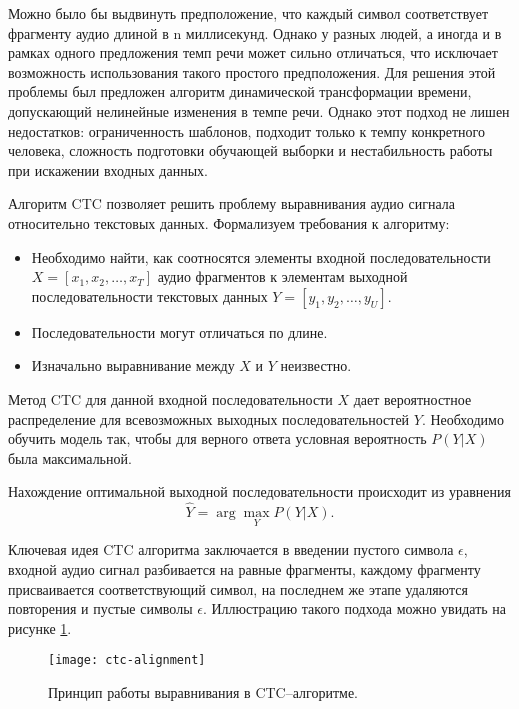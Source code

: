 Можно было бы выдвинуть предположение, что каждый символ соответствует фрагменту аудио длиной в n миллисекунд. Однако у разных людей, а иногда и в рамках одного предложения темп речи может сильно отличаться, что исключает возможность использования такого простого предположения. Для решения этой проблемы был предложен алгоритм динамической трансформации времени\cite{berndt1994using}, допускающий нелинейные изменения в темпе речи. Однако этот подход не лишен недостатков: ограниченность шаблонов, подходит только к темпу конкретного человека, сложность подготовки обучающей выборки и нестабильность работы при искажении входных данных.

Алгоритм CTC позволяет решить проблему выравнивания аудио сигнала относительно текстовых данных. Формализуем требования к алгоритму:
\begin{itemize}
	\item Необходимо найти, как соотносятся элементы входной последовательности $X = [x_1, x_2, \dots, x_T]$ аудио фрагментов к элементам выходной последовательности текстовых данных $Y = [y_1, y_2, \dots, y_U]$.
	\item Последовательности могут отличаться по длине.
	\item Изначально выравнивание между $X$ и $Y$ неизвестно.
\end{itemize}

Метод CTC для данной входной последовательности $X$ дает вероятностное распределение для всевозможных выходных последовательностей $Y$. Необходимо обучить модель так, чтобы для верного ответа условная вероятность $P(Y | X)$ была максимальной.

Нахождение оптимальной выходной последовательности происходит из уравнения
\begin{equation}
	\label{eq:ctc-result}
	\hat{Y} = \arg \max_Y P(Y | X).
\end{equation}

Ключевая идея CTC алгоритма заключается в введении пустого символа $\epsilon$, входной аудио сигнал разбивается на равные фрагменты, каждому фрагменту присваивается соответствующий символ, на последнем же этапе удаляются повторения и пустые символы $\epsilon$. Иллюстрацию такого подхода можно увидать на рисунке \ref{fig:ctc-alignment}.

\begin{figure}[h]
	\centering
	\texttt{[image: ctc-alignment]}
	\caption{Принцип работы выравнивания в CTC--алгоритме.}
	\label{fig:ctc-alignment}
\end{figure}

